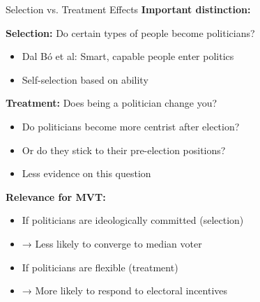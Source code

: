 \documentclass[10pt]{beamer}
\begin{document}
\begin{frame}{Selection vs. Treatment Effects}
\textbf{Important distinction:}



\textbf{Selection:} Do certain types of people become politicians?
\begin{itemize}
\item Dal Bó et al: Smart, capable people enter politics
\item Self-selection based on ability
\end{itemize}



\textbf{Treatment:} Does being a politician change you?
\begin{itemize}
\item Do politicians become more centrist after election?
\item Or do they stick to their pre-election positions?
\item Less evidence on this question
\end{itemize}



\textbf{Relevance for MVT:}
\begin{itemize}
\item If politicians are ideologically committed (selection)
\item → Less likely to converge to median voter
\item If politicians are flexible (treatment)
\item → More likely to respond to electoral incentives
\end{itemize}
\end{frame}
\end{document}

